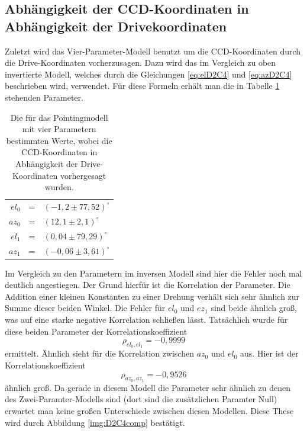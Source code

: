\subsection{Abhängigkeit der CCD-Koordinaten in Abhängigkeit der Drivekoordinaten}
Zuletzt wird das Vier-Parameter-Modell benutzt um die CCD-Koordinaten durch die Drive-Koordinaten vorherzusagen. Dazu wird das im Vergleich zu oben invertierte Modell, welches durch die Gleichungen \ref{eq:elD2C4} und \ref{eq:azD2C4} beschrieben wird, verwendet. Für diese Formeln erhält man die in Tabelle \ref{tab:D2C4} stehenden Parameter.
\begin{table}[htbp]
\centering
\begin{tabular}{rcl}
\toprule
$el_0$ &=& $(-1,2\pm 77,52)^{\circ}$\\
$az_0$ &=& $(12,1\pm 2,1)^{\circ}$\\
$el_1$ &=& $(0,04\pm 79,29)^{\circ}$\\
$az_1$ &=& $(-0,06\pm 3,61)^{\circ}$\\
\bottomrule
\end{tabular}
\caption{Die für das Pointingmodell mit vier Parametern bestimmten Werte, wobei die CCD-Koordinaten in Abhängigkeit der Drive-Koordinaten vorhergesagt wurden.}
\label{tab:D2C4}
\end{table}
Im Vergleich zu den Parametern im inversen Modell sind hier die Fehler noch mal deutlich angestiegen. Der Grund hierfür ist die Korrelation der Parameter. Die Addition einer kleinen Konstanten zu einer Drehung verhält sich sehr ähnlich zur Summe dieser beiden Winkel. Die Fehler für $el_0$ und $ez_1$ sind beide ähnlich groß, was auf eine starke negative Korrelation schließen lässt. Tatsächlich wurde für diese beiden Parameter der Korrelationskoeffizient 
\begin{equation}
\rho_{el_0,el_1}= -0,9999
\end{equation}
ermittelt. Ähnlich sieht für die Korrelation zwischen $az_0$ und $el_0$ aus. Hier ist der Korrelationskoeffizient
\begin{equation}
\rho_{az_0,az_1}= -0,9526
\end{equation}
ähnlich groß. Da gerade in diesem Modell die Parameter sehr ähnlich zu denen des Zwei-Paramter-Modells sind (dort sind die zusätzlichen Paramter Null) erwartet man keine großen Unterschiede zwischen diesen Modellen. Diese These wird durch Abbildung \ref{img:D2C4comp} bestätigt.
